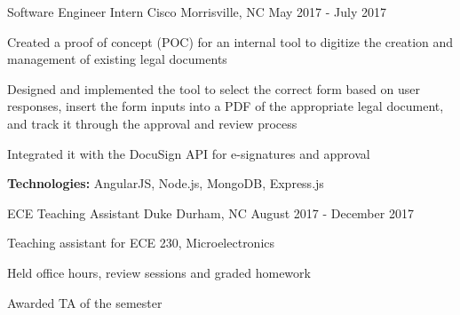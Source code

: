 \begin{cventries}
  \cventry
    {Software Engineer Intern} %
    {Cisco} %
    {Morrisville, NC} %
    {May 2017 - July 2017} %
    {
      \begin{cvitems} %
        \item{Created a proof of concept (POC) for an internal tool to digitize the creation and management of existing legal documents}
        \item{Designed and implemented the tool to select the correct form based on user responses, insert the form inputs into a PDF of the appropriate legal document, and track it through the approval and review process}
        \item{Integrated it with the DocuSign API for e-signatures and approval}
        {\setlength \itemindent{-2ex} \itemsep2pt \item[] \textbf{Technologies:} AngularJS, Node.js, MongoDB, Express.js}
      \end{cvitems}
    }
    
    \cventry
    {ECE Teaching Assistant} %
    {Duke} %
    {Durham, NC} %
    {August 2017 - December 2017} %
    {
      \begin{cvitems} %
        \item{Teaching assistant for ECE 230, Microelectronics}
        \item{Held office hours, review sessions and graded homework}
        \item{Awarded TA of the semester}
      \end{cvitems}
    }
\end{cventries}
